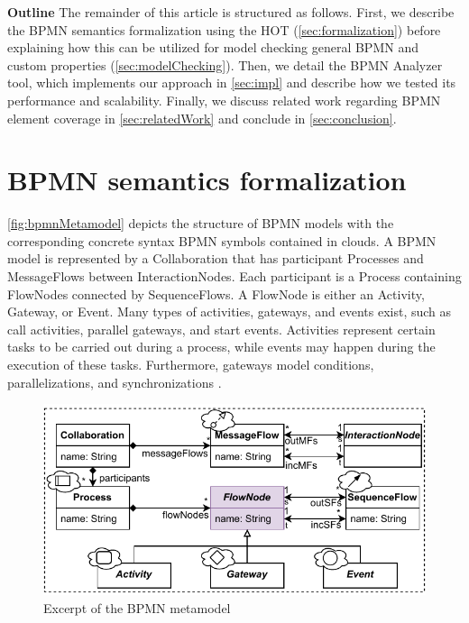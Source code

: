 \documentclass{lmcs} %
\begin{document}
\textbf{Outline} The remainder of this article is structured as follows.
First, we describe the BPMN semantics formalization using the HOT (\autoref{sec:formalization}) before explaining how this can be utilized for model checking general BPMN and custom properties (\autoref{sec:modelChecking}).
Then, we detail the BPMN Analyzer tool, which implements our approach in \autoref{sec:impl} and describe how we tested its performance and scalability.
Finally, we discuss related work regarding BPMN element coverage in \autoref{sec:relatedWork} and conclude in \autoref{sec:conclusion}.



\section{BPMN semantics formalization} \label{sec:formalization}

\autoref{fig:bpmnMetamodel} depicts the structure of BPMN models with the corresponding concrete syntax BPMN symbols contained in clouds.
A BPMN model is represented by a \textsf{Collaboration} that has participant \textsf{Process}es and \textsf{MessageFlow}s between \textsf{InteractionNode}s.
Each participant is a \textsf{Process} containing \textsf{FlowNode}s connected by \textsf{SequenceFlow}s.
A \textsf{FlowNode} is either an \textsf{Activity}, \textsf{Gateway}, or \textsf{Event}.
Many types of activities, gateways, and events exist, such as call activities, parallel gateways, and start events.
Activities represent certain tasks to be carried out during a process, while events may happen during the execution of these tasks.
Furthermore, gateways model conditions, parallelizations, and synchronizations \cite{freundRealLifeBPMNUsing2019}.

\begin{figure}[ht]
  \centering
  \includegraphics[width=0.8\linewidth]{images/bpmn_semantics-bpmn-metamodel.pdf}
  \caption{Excerpt of the BPMN metamodel \cite{objectmanagementgroupBusinessProcessModel2013}}
  \label{fig:bpmnMetamodel}
\end{figure}
\end{document}
